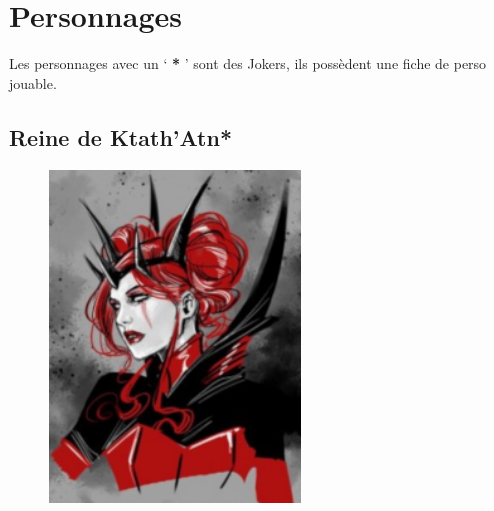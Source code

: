 \section{Personnages}
Les personnages avec un ‘ \textbf{*} ’ sont des Jokers, ils possèdent une fiche de perso jouable. 

\subsection{Reine de Ktath’Atn*} \label{sec:ktath-atn-queen}
\begin{figure}[h!]
    \centering
    \includegraphics[height=250pt]{_img/pnjs/ktath-atn-queen.png}
\end{figure}
